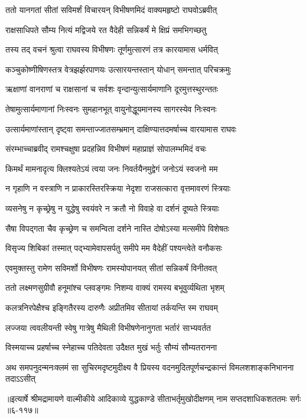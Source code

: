 \twolineshloka
{ततो यानगतां सीतां सविमर्शं विचारयन्}
{विभीषणमिदं वाक्यमहृष्टो राघवोऽब्रवीत्} %

\twolineshloka
{राक्षसाधिपते सौम्य नित्यं मद्विजये रत}
{वैदेही सन्निकर्षं मे क्षिप्रं समभिगच्छतु} %

\twolineshloka
{तस्य तद् वचनं श्रुत्वा राघवस्य विभीषणः}
{तूर्णमुत्सारणं तत्र कारयामास धर्मवित्} %

\twolineshloka
{कञ्चुकोष्णीषिणस्तत्र वेत्रझर्झरपाणयः}
{उत्सारयन्तस्तान् योधान् समन्तात् परिचक्रमुः} %

\twolineshloka
{ऋक्षाणां वानराणां च राक्षसानां च सर्वशः}
{वृन्दान्युत्सार्यमाणानि दूरमुत्तस्थुरन्ततः} %

\twolineshloka
{तेषामुत्सार्यमाणानां निःस्वनः सुमहानभूत्}
{वायुनोद्धूयमानस्य सागरस्येव निःस्वनः} %

\twolineshloka
{उत्सार्यमाणांस्तान् दृष्ट्वा समन्ताज्जातसम्भ्रमान्}
{दाक्षिण्यात्तदमर्षाच्च वारयामास राघवः} %

\twolineshloka
{संरम्भाच्चाब्रवीद् रामश्चक्षुषा प्रदहन्निव}
{विभीषणं महाप्राज्ञं सोपालम्भमिदं वचः} %

\twolineshloka
{किमर्थं मामनादृत्य क्लिश्यतेऽयं त्वया जनः}
{निवर्तयैनमुद्वेगं जनोऽयं स्वजनो मम} %

\twolineshloka
{न गृहाणि न वस्त्राणि न प्राकारस्तिरस्क्रिया}
{नेदृशा राजसत्कारा वृत्तमावरणं स्त्रियाः} %

\twolineshloka
{व्यसनेषु न कृच्छ्रेषु न युद्धेषु स्वयंवरे}
{न क्रतौ नो विवाहे वा दर्शनं दूष्यते स्त्रियाः} %

\twolineshloka
{सैषा विपद्गता चैव कृच्छ्रेण च समन्विता}
{दर्शने नास्ति दोषोऽस्या मत्समीपे विशेषतः} %

\twolineshloka
{विसृज्य शिबिकां तस्मात् पद्भ्यामेवापसर्पतु}
{समीपे मम वैदेहीं पश्यन्त्वेते वनौकसः} %

\twolineshloka
{एवमुक्तस्तु रामेण सविमर्शो विभीषणः}
{रामस्योपानयत् सीतां सन्निकर्षं विनीतवत्} %

\twolineshloka
{ततो लक्ष्मणसुग्रीवौ हनूमांश्च प्लवङ्गमः}
{निशम्य वाक्यं रामस्य बभूवुर्व्यथिता भृशम्} %

\twolineshloka
{कलत्रनिरपेक्षैश्च इङ्गितैरस्य दारुणैः}
{अप्रीतमिव सीतायां तर्कयन्ति स्म राघवम्} %

\twolineshloka
{लज्जया त्ववलीयन्ती स्वेषु गात्रेषु मैथिली}
{विभीषणेनानुगता भर्तारं साभ्यवर्तत} %

\twolineshloka
{विस्मयाच्च प्रहर्षाच्च स्नेहाच्च पतिदेवता}
{उदैक्षत मुखं भर्तुः सौम्यं सौम्यतरानना} %

\twolineshloka
{अथ समपनुदन्मनःक्लमं सा सुचिरमदृष्टमुदीक्ष्य वै प्रियस्य}
{वदनमुदितपूर्णचन्द्रकान्तं विमलशशाङ्कनिभानना तदाऽऽसीत्} %


॥इत्यार्षे श्रीमद्रामायणे वाल्मीकीये आदिकाव्ये युद्धकाण्डे सीताभर्तृमुखोदीक्षणम् नाम सप्तदशाधिकशततमः सर्गः ॥६-११७॥
